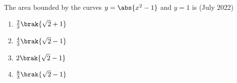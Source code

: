     \item The area bounded by the curves $y=\abs{x^2-1}$ and $y=1$ is 
   \hfill{(July 2022)} 
\begin{enumerate}
        \item $\frac{2}{3}\brak{\sqrt{2}+1}$
        \item $\frac{4}{3}\brak{\sqrt{2}-1}$
        \item $2\brak{\sqrt{2}-1}$
        \item $\frac{8}{3}\brak{\sqrt{2}-1}$
    \end{enumerate}
